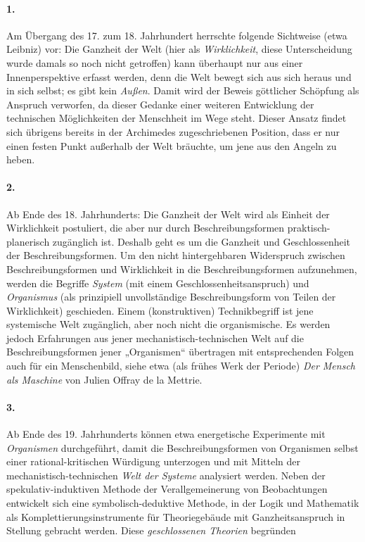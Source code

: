 \documentclass[11pt,a4paper]{article}
\begin{document}
\paragraph{1.}
Am Übergang des 17. zum 18. Jahrhundert herrschte folgende Sichtweise (etwa
Leibniz) vor: Die Ganzheit der Welt (hier als \emph{Wirklichkeit}, diese
Unterscheidung wurde damals so noch nicht getroffen) kann überhaupt nur aus
einer Innenperspektive erfasst werden, denn die Welt bewegt sich aus sich
heraus und in sich selbst; es gibt kein \emph{Außen}. Damit wird der Beweis
göttlicher Schöpfung als Anspruch verworfen, da dieser Gedanke einer weiteren
Entwicklung der technischen Möglichkeiten der Menschheit im Wege steht.
Dieser Ansatz findet sich übrigens bereits in der Archimedes zugeschriebenen
Position, dass er nur einen festen Punkt außerhalb der Welt bräuchte, um jene
aus den Angeln zu heben.

\paragraph{2.}
Ab Ende des 18. Jahrhunderts: Die Ganzheit der Welt wird als Einheit der
Wirklichkeit postuliert, die aber nur durch Beschreibungsformen
praktisch-planerisch zugänglich ist. Deshalb geht es um die Ganzheit und
Geschlossenheit der Beschreibungsformen. Um den nicht hintergehbaren
Widerspruch zwischen Beschreibungsformen und Wirklichkeit in die
Beschreibungsformen aufzunehmen, werden die Begriffe \emph{System} (mit einem
Geschlossenheitsanspruch) und \emph{Organismus} (als prinzipiell
unvollständige Beschreibungsform von Teilen der Wirklichkeit) geschieden.
Einem (konstruktiven) Technikbegriff ist jene systemische Welt zugänglich,
aber noch nicht die organismische. Es werden jedoch Erfahrungen aus jener
mechanistisch-technischen Welt auf die Beschreibungsformen jener „Organismen“
übertragen mit entsprechenden Folgen auch für ein Menschenbild, siehe etwa
(als frühes Werk der Periode) \emph{Der Mensch als Maschine} von Julien Offray
de la Mettrie.

\paragraph{3.}
Ab Ende des 19. Jahrhunderts können etwa energetische Experimente mit
\emph{Organismen} durchgeführt, damit die Beschreibungsformen von Organismen
selbst einer rational-kritischen Würdigung unterzogen und mit Mitteln der
mechanistisch-technischen \emph{Welt der Systeme} analysiert werden. Neben der
spekulativ-induktiven Methode der Verallgemeinerung von Beobachtungen
entwickelt sich eine symbolisch-deduktive Methode, in der Logik und Mathematik
als Komplettierungsinstrumente für Theoriegebäude mit Ganzheitsanspruch in
Stellung gebracht werden. Diese \emph{geschlossenen Theorien} begründen
\end{document}
